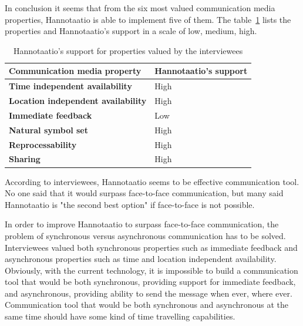 \documentclass[english,12pt,a4paper,pdftex]{article}
\begin{document}
In conclusion it seems that from the six most valued communication media properties, Hannotaatio is able to implement  five of them. The table~\ref{table:hannotaatios_support} lists the properties and Hannotaatio's support in a scale of low, medium, high.

\begin{table}[!h]
\renewcommand{\arraystretch}{1.3}
\caption{Hannotaatio's support for properties valued by the interviewees}
\label{table:hannotaatios_support}
\centering
\begin{tabular}{|p{8cm}|p{5cm}|}
\hline
\textbf{Communication media property} & \textbf{Hannotaatio's support} \\
\hline
\textbf{Time independent availability} & High \\
\hline
\textbf{Location independent availability} & High \\
\hline
\textbf{Immediate feedback} & Low \\
\hline
\textbf{Natural symbol set} & High \\
\hline
\textbf{Reprocessability} & High \\
\hline
\textbf{Sharing} & High \\
\hline
\end{tabular}
\end{table}

According to interviewees, Hannotaatio seems to be effective communication tool. No one said that it would surpass face-to-face communication, but many said Hannotaatio is "the second best option" if face-to-face is not possible.

In order to improve Hannotaatio to surpass face-to-face communication, the problem of synchronous versus asynchronous communication has to be solved. Interviewees valued both synchronous properties such as immediate feedback and asynchronous properties such as time and location independent availability. Obviously, with the current technology, it is impossible to build a communication tool that would be both synchronous, providing support for immediate feedback, and asynchronous, providing ability to send the message when ever, where ever. Communication tool that would be both synchronous and asynchronous at the same time should have some kind of time travelling capabilities.
\end{document}
